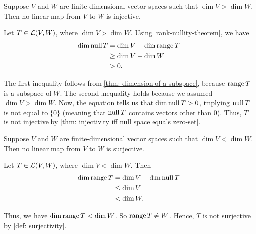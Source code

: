 \setcounter{thm}{21}
\begin{thm} 
  \label{thm: linear-map-to-a-lower-dimensional-space-is-not-injective}
  Suppose $V$ and $W$ are finite-dimensional vector spaces such that $\dim V > \dim W$.
  Then no linear map from $V$ to $W$ is injective.
\end{thm}
\begin{prf} Let $T\in \mathcal{L}(V,W)$, where $\dim V > \dim W$. Using \ref{rank-nullity-theorem}, we have
  \begin{align}
    \dim \operatorname{null} T &= \dim V - \dim \operatorname{range} T \\
                   &\geq \dim V - \dim W  \\
                   &> 0.
  \end{align}

  The first inequality follows from \ref{thm: dimension of a subspace}, because $\operatorname{range} T$ is a subspace of $W$. The second inequality holds because we assumed $\dim V > \dim W$. Now, the equation tells us that $\dim \operatorname{null} T > 0$, implying $\operatorname{null} T$ is not equal to $\{0\}$ (meaning that $\operatorname{null} T$ contains vectors other than $0$). Thus, $T$ is not injective by \ref{thm: injectivity iff null space equals zero-set}.
\end{prf}

\begin{thm} 
  \label{thm: linear map to a higher-dimensional space is not surjective}
  Suppose $V$ and $W$ are finite-dimensional vector spaces such that $\dim V < \dim W$. Then no linear map from $V$ to $W$ is surjective.
\end{thm}
\begin{prf}
  Let $T\in \mathcal{L} (V,W)$, where $\dim V < \dim W$. Then
  \begin{align}
    \dim \operatorname{range} T & = \dim V - \dim \operatorname{null} T \\
                    & \leq \dim V  \\
                    & < \dim W.
  \end{align}

  Thus, we have $\dim \operatorname{range} T < \dim W$. So $\operatorname{range} T \neq W$. Hence, $T$ is not surjective by \ref{def: surjectivity}.
\end{prf}

